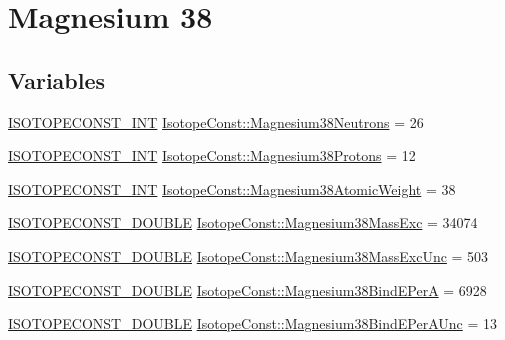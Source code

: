 \hypertarget{group___isotope_const-_magnesium-_mg38}{}\section{Magnesium 38}
\label{group___isotope_const-_magnesium-_mg38}
\subsection*{Variables}
\begin{DoxyCompactItemize}
\item 
\mbox{\hyperlink{group___isotope_const-_macros_ga5f18360b3e99483a35c32d789e62621c}{I\+S\+O\+T\+O\+P\+E\+C\+O\+N\+S\+T\+\_\+\+I\+NT}} \mbox{\hyperlink{group___isotope_const-_magnesium-_mg38_ga5b9de8afa4985287854c85667c574f75}{Isotope\+Const\+::\+Magnesium38\+Neutrons}} = 26
\item 
\mbox{\hyperlink{group___isotope_const-_macros_ga5f18360b3e99483a35c32d789e62621c}{I\+S\+O\+T\+O\+P\+E\+C\+O\+N\+S\+T\+\_\+\+I\+NT}} \mbox{\hyperlink{group___isotope_const-_magnesium-_mg38_ga4fd68c4bd1ab9781c7dd7b41bd9eb3a9}{Isotope\+Const\+::\+Magnesium38\+Protons}} = 12
\item 
\mbox{\hyperlink{group___isotope_const-_macros_ga5f18360b3e99483a35c32d789e62621c}{I\+S\+O\+T\+O\+P\+E\+C\+O\+N\+S\+T\+\_\+\+I\+NT}} \mbox{\hyperlink{group___isotope_const-_magnesium-_mg38_gaefab1b52ae008b136a79d061c137bbfd}{Isotope\+Const\+::\+Magnesium38\+Atomic\+Weight}} = 38
\item 
\mbox{\hyperlink{group___isotope_const-_macros_ga8f45a7272ce02c0b4c65c44636ed719a}{I\+S\+O\+T\+O\+P\+E\+C\+O\+N\+S\+T\+\_\+\+D\+O\+U\+B\+LE}} \mbox{\hyperlink{group___isotope_const-_magnesium-_mg38_ga73232a6869e95bfcc333af6b52d0e2d0}{Isotope\+Const\+::\+Magnesium38\+Mass\+Exc}} = 34074
\item 
\mbox{\hyperlink{group___isotope_const-_macros_ga8f45a7272ce02c0b4c65c44636ed719a}{I\+S\+O\+T\+O\+P\+E\+C\+O\+N\+S\+T\+\_\+\+D\+O\+U\+B\+LE}} \mbox{\hyperlink{group___isotope_const-_magnesium-_mg38_gaa230d01c89681084a867902079e8d438}{Isotope\+Const\+::\+Magnesium38\+Mass\+Exc\+Unc}} = 503
\item 
\mbox{\hyperlink{group___isotope_const-_macros_ga8f45a7272ce02c0b4c65c44636ed719a}{I\+S\+O\+T\+O\+P\+E\+C\+O\+N\+S\+T\+\_\+\+D\+O\+U\+B\+LE}} \mbox{\hyperlink{group___isotope_const-_magnesium-_mg38_ga3ef25c98b0a0ca3d84de41a20c429c5b}{Isotope\+Const\+::\+Magnesium38\+Bind\+E\+PerA}} = 6928
\item 
\mbox{\hyperlink{group___isotope_const-_macros_ga8f45a7272ce02c0b4c65c44636ed719a}{I\+S\+O\+T\+O\+P\+E\+C\+O\+N\+S\+T\+\_\+\+D\+O\+U\+B\+LE}} \mbox{\hyperlink{group___isotope_const-_magnesium-_mg38_ga3dbc4647a0c6fe64313a38e09dd01da0}{Isotope\+Const\+::\+Magnesium38\+Bind\+E\+Per\+A\+Unc}} = 13

\end{DoxyCompactItemize}

